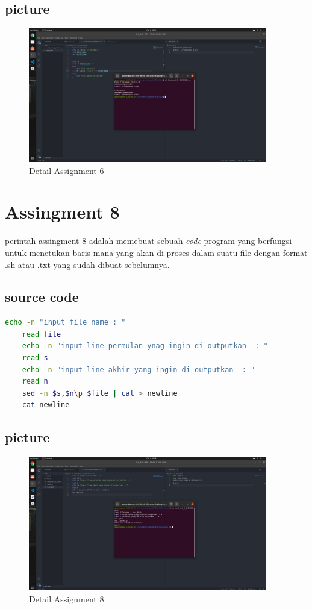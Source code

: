 \documentclass[11pt,a4paper]{article}
\begin{document}
\subsection*{picture}
\begin{figure}[h]
	\centering
	\includegraphics[width=0.93\textwidth]{figure/task_6.png}
	\caption{Detail Assignment 6}
\end{figure}

\newpage
\section{Assingment 8}
perintah assingment 8 adalah memebuat sebuah \textit{code} program yang berfungsi untuk menetukan baris mana yang akan di proses dalam suatu file dengan format .sh atau .txt yang sudah dibuat sebelumnya.
\subsection*{source code}
\begin{lstlisting}[language=bash, caption={source code Assingment 8}]
	echo -n "input file name : "
	read file
	echo -n "input line permulan ynag ingin di outputkan  : "
	read s
	echo -n "input line akhir yang ingin di outputkan  : "
	read n
	sed -n $s,$n\p $file | cat > newline
	cat newline
\end{lstlisting}

\subsection*{picture}
\begin{figure}[h]
	\centering
	\includegraphics[width=0.93\textwidth]{figure/task_8.png}
	\caption{Detail Assignment 8}
\end{figure}
\end{document}
